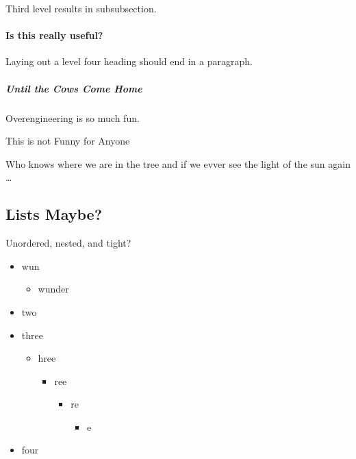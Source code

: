 Third level results in subsubsection.

\hypertarget{is-this-really-useful}{%
\paragraph{Is this really useful?}\label{is-this-really-useful}}

Laying out a level four heading should end in a paragraph.

\hypertarget{until-the-cows-come-home}{%
\subparagraph{Until the Cows Come Home}\label{until-the-cows-come-home}}

Overengineering is so much fun.

This is not Funny for Anyone

Who knows where we are in the tree and if we evver see the light of the
sun again \ldots{}

\hypertarget{lists-maybe}{%
\subsection{Lists Maybe?}\label{lists-maybe}}

Unordered, nested, and tight?

\begin{itemize}
\tightlist
\item
  wun

  \begin{itemize}
  \tightlist
  \item
    wunder
  \end{itemize}
\item
  two
\item
  three

  \begin{itemize}
  \tightlist
  \item
    hree

    \begin{itemize}
    \tightlist
    \item
      ree

      \begin{itemize}
      \tightlist
      \item
        re

        \begin{itemize}
        \tightlist
        \item
          e
        \end{itemize}
      \end{itemize}
    \end{itemize}
  \end{itemize}
\item
  four
\end{itemize}

